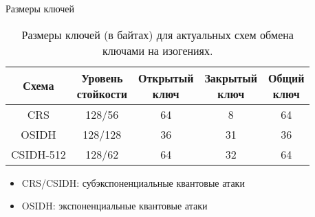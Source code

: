 \documentclass{beamer}
\begin{document}
\begin{frame}{Размеры ключей}
	
	\begin{table}[h]
		\begin{center}
			\begin{tabular}{|c|c|c|c|c|}
				\hline
				Схема & \thead{Уровень\\ стойкости} &
				\thead{Открытый\\ключ}
				& \thead{Закрытый\\ключ} & \thead{Общий\\ключ} \\
				\hline
				CRS%
				& 128/56 & 64 & 8 & 64  \\
				\hline
				OSIDH%
				& 128/128 & 36 & 31 & 36 \\
				\hline
				CSIDH-512 & 128/62 & 64 & 32 & 64 \\
				\hline
			\end{tabular}
		\end{center}
		\caption{Размеры ключей (в байтах) для актуальных схем обмена ключами на изогениях.}
		\label{Table1}
	\end{table}
	
	\begin{itemize}
		\item CRS/CSIDH: субэкспоненциальные квантовые атаки
		\item OSIDH: экспоненциальные квантовые атаки
	\end{itemize}
\end{frame}
\end{document}

